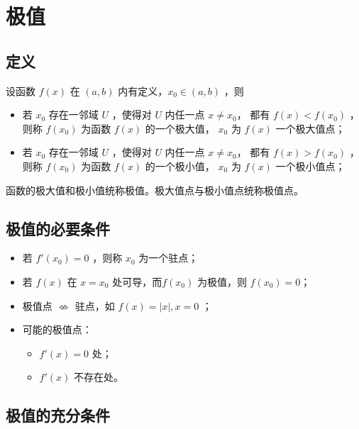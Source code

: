 \section{极值}

\subsection{定义}

\begin{Def}[极值]

    设函数 $ f(x) $ 在 $ (a,b) $ 内有定义，$ x_0\in (a,b) $ ，则
    \begin{itemize}
        \item 若 $ x_0 $ 存在一邻域 $ U $ ，使得对 $ U $ 内任一点 $ x \neq x_0 $，
        都有 $ f(x)<f(x_0) $ ，则称 $ f(x_0) $ 为函数 $ f(x) $ 的一个极大值，
        $ x_0 $ 为 $ f(x) $ 一个极大值点；
        \item 若 $ x_0 $ 存在一邻域 $ U $ ，使得对 $ U $ 内任一点 $ x \neq x_0 $，
        都有 $ f(x)>f(x_0) $ ，则称 $ f(x_0) $ 为函数 $ f(x) $ 的一个极小值，
        $ x_0 $ 为 $ f(x) $ 一个极小值点；
    \end{itemize}
    函数的极大值和极小值统称极值。极大值点与极小值点统称极值点。
\end{Def}

\subsection{极值的必要条件}

\begin{itemize}
    \item 若 $ f'(x_0)=0 $ ，则称 $ x_0 $ 为一个驻点；
    \item 若 $ f(x) $ 在 $ x=x_0 $ 处可导，而$ f(x_0) $ 为极值，则 $ f(x_0)=0 $；
    \item 极值点 $ \nLeftrightarrow $ 驻点，如 $ f(x)=|x|, x=0 $ ；
    \item 可能的极值点：\begin{itemize}
        \item $ f'(x)=0 $ 处；
        \item $ f'(x) $ 不存在处。
    \end{itemize}
\end{itemize}

\subsection{极值的充分条件}


